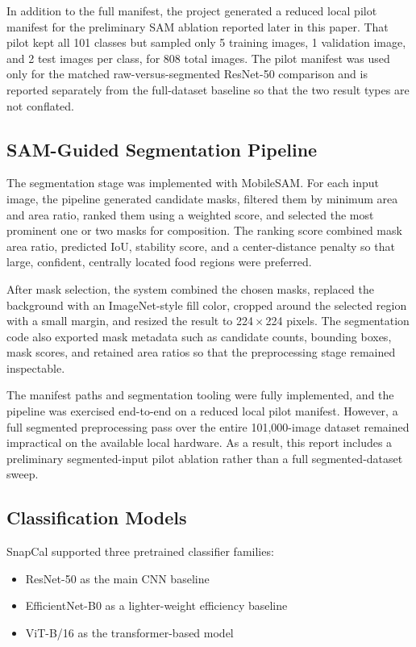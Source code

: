 \documentclass[sigconf,nonacm,11pt]{acmart}
\begin{document}
In addition to the full manifest, the project generated a reduced local pilot manifest for the preliminary SAM ablation reported later in this paper. That pilot kept all 101 classes but sampled only 5 training images, 1 validation image, and 2 test images per class, for 808 total images. The pilot manifest was used only for the matched raw-versus-segmented ResNet-50 comparison and is reported separately from the full-dataset baseline so that the two result types are not conflated.

\subsection{SAM-Guided Segmentation Pipeline}
The segmentation stage was implemented with MobileSAM. For each input image, the pipeline generated candidate masks, filtered them by minimum area and area ratio, ranked them using a weighted score, and selected the most prominent one or two masks for composition. The ranking score combined mask area ratio, predicted IoU, stability score, and a center-distance penalty so that large, confident, centrally located food regions were preferred.

After mask selection, the system combined the chosen masks, replaced the background with an ImageNet-style fill color, cropped around the selected region with a small margin, and resized the result to 224\,$\times$\,224 pixels. The segmentation code also exported mask metadata such as candidate counts, bounding boxes, mask scores, and retained area ratios so that the preprocessing stage remained inspectable.

The manifest paths and segmentation tooling were fully implemented, and the pipeline was exercised end-to-end on a reduced local pilot manifest. However, a full segmented preprocessing pass over the entire 101,000-image dataset remained impractical on the available local hardware. As a result, this report includes a preliminary segmented-input pilot ablation rather than a full segmented-dataset sweep.

\subsection{Classification Models}
SnapCal supported three pretrained classifier families:

\begin{itemize}
\item ResNet-50 as the main CNN baseline \cite{he2016resnet}
\item EfficientNet-B0 as a lighter-weight efficiency baseline \cite{tan2019efficientnet}
\item ViT-B/16 as the transformer-based model \cite{dosovitskiy2021vit}
\end{itemize}
\end{document}
